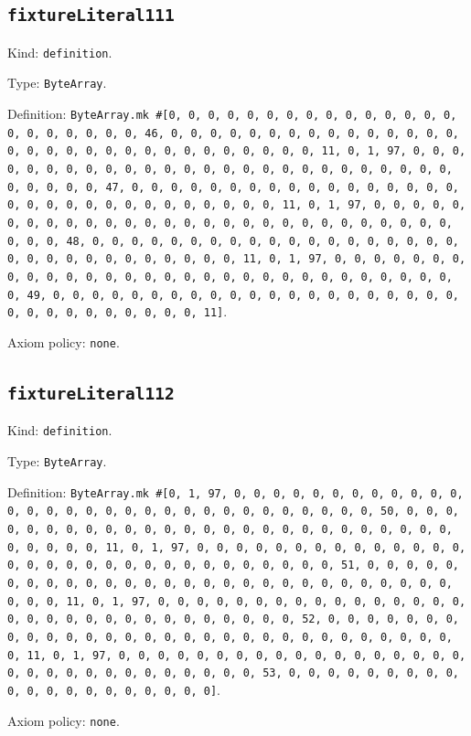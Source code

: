\documentclass[11pt]{article}
\begin{document}
\subsection*{\texttt{fixtureLiteral111}}
\noindent Kind: \texttt{definition}.\par
\noindent Type: \texttt{ByteArray}.\par
\noindent Definition: \texttt{ByteArray.mk \#[0, 0, 0, 0, 0, 0, 0, 0, 0, 0, 0, 0, 0, 0, 0, 0, 0, 0, 0, 0, 0, 0, 46, 0, 0, 0, 0, 0, 0, 0, 0, 0, 0, 0, 0, 0, 0, 0, 0, 0, 0, 0, 0, 0, 0, 0, 0, 0, 0, 0, 0, 0, 0, 0, 11, 0, 1, 97, 0, 0, 0, 0, 0, 0, 0, 0, 0, 0, 0, 0, 0, 0, 0, 0, 0, 0, 0, 0, 0, 0, 0, 0, 0, 0, 0, 0, 0, 0, 0, 47, 0, 0, 0, 0, 0, 0, 0, 0, 0, 0, 0, 0, 0, 0, 0, 0, 0, 0, 0, 0, 0, 0, 0, 0, 0, 0, 0, 0, 0, 0, 0, 11, 0, 1, 97, 0, 0, 0, 0, 0, 0, 0, 0, 0, 0, 0, 0, 0, 0, 0, 0, 0, 0, 0, 0, 0, 0, 0, 0, 0, 0, 0, 0, 0, 0, 0, 48, 0, 0, 0, 0, 0, 0, 0, 0, 0, 0, 0, 0, 0, 0, 0, 0, 0, 0, 0, 0, 0, 0, 0, 0, 0, 0, 0, 0, 0, 0, 0, 11, 0, 1, 97, 0, 0, 0, 0, 0, 0, 0, 0, 0, 0, 0, 0, 0, 0, 0, 0, 0, 0, 0, 0, 0, 0, 0, 0, 0, 0, 0, 0, 0, 0, 0, 49, 0, 0, 0, 0, 0, 0, 0, 0, 0, 0, 0, 0, 0, 0, 0, 0, 0, 0, 0, 0, 0, 0, 0, 0, 0, 0, 0, 0, 0, 0, 0, 11]}.\par
\noindent Axiom policy: \texttt{none}.\par
\subsection*{\texttt{fixtureLiteral112}}
\noindent Kind: \texttt{definition}.\par
\noindent Type: \texttt{ByteArray}.\par
\noindent Definition: \texttt{ByteArray.mk \#[0, 1, 97, 0, 0, 0, 0, 0, 0, 0, 0, 0, 0, 0, 0, 0, 0, 0, 0, 0, 0, 0, 0, 0, 0, 0, 0, 0, 0, 0, 0, 0, 0, 0, 50, 0, 0, 0, 0, 0, 0, 0, 0, 0, 0, 0, 0, 0, 0, 0, 0, 0, 0, 0, 0, 0, 0, 0, 0, 0, 0, 0, 0, 0, 0, 0, 11, 0, 1, 97, 0, 0, 0, 0, 0, 0, 0, 0, 0, 0, 0, 0, 0, 0, 0, 0, 0, 0, 0, 0, 0, 0, 0, 0, 0, 0, 0, 0, 0, 0, 0, 51, 0, 0, 0, 0, 0, 0, 0, 0, 0, 0, 0, 0, 0, 0, 0, 0, 0, 0, 0, 0, 0, 0, 0, 0, 0, 0, 0, 0, 0, 0, 0, 11, 0, 1, 97, 0, 0, 0, 0, 0, 0, 0, 0, 0, 0, 0, 0, 0, 0, 0, 0, 0, 0, 0, 0, 0, 0, 0, 0, 0, 0, 0, 0, 0, 0, 0, 52, 0, 0, 0, 0, 0, 0, 0, 0, 0, 0, 0, 0, 0, 0, 0, 0, 0, 0, 0, 0, 0, 0, 0, 0, 0, 0, 0, 0, 0, 0, 0, 11, 0, 1, 97, 0, 0, 0, 0, 0, 0, 0, 0, 0, 0, 0, 0, 0, 0, 0, 0, 0, 0, 0, 0, 0, 0, 0, 0, 0, 0, 0, 0, 0, 0, 0, 53, 0, 0, 0, 0, 0, 0, 0, 0, 0, 0, 0, 0, 0, 0, 0, 0, 0, 0, 0, 0]}.\par
\noindent Axiom policy: \texttt{none}.\par
\end{document}
